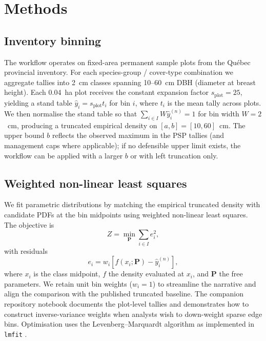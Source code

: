 \section{Methods}
\label{sec:methods}

\subsection{Inventory binning}
\label{sec:methods_binning}

The workflow operates on fixed-area permanent sample plots from the Qu\'ebec provincial inventory. For each species-group / cover-type combination we aggregate tallies into 2~cm classes spanning 10--60~cm DBH (diameter at breast height). Each 0.04~ha plot receives the constant expansion factor $s_{\text{plot}} = 25$, yielding a stand table $\hat{y}_i = s_{\text{plot}} t_i$ for bin $i$, where $t_i$ is the mean tally across plots. We then normalise the stand table so that $\sum_{i \in I} W \hat{y}_i^{(n)} = 1$ for bin width $W = 2$~cm, producing a truncated empirical density on $[a, b] = [10, 60]$~cm.
The upper bound $b$ reflects the observed maximum in the PSP tallies (and management caps where applicable); if no defensible upper limit exists, the workflow can be applied with a larger $b$ or with left truncation only.

\subsection{Weighted non-linear least squares}
\label{sec:methods_nlls}

We fit parametric distributions by matching the empirical truncated density with candidate PDFs at the bin midpoints using weighted non-linear least squares. The objective is
\begin{equation}
  Z = \min_{\bm{P}} \sum_{i \in I} e_i^2,
\end{equation}
with residuals
\begin{equation}
  e_i = w_i \left[f(x_i; \bm{P}) - \hat{y}_i^{(n)}\right],
\end{equation}
where $x_i$ is the class midpoint, $f$ the density evaluated at $x_i$, and $\bm{P}$ the free parameters. We retain unit bin weights ($w_i = 1$) to streamline the narrative and align the comparison with the published truncated baseline. The companion repository notebook documents the plot-level tallies and demonstrates how to construct inverse-variance weights when analysts wish to down-weight sparse edge bins.
Optimisation uses the Levenberg--Marquardt algorithm as implemented in \texttt{lmfit} \citep{levenberg1944method, marquardt1963algorithm}.

